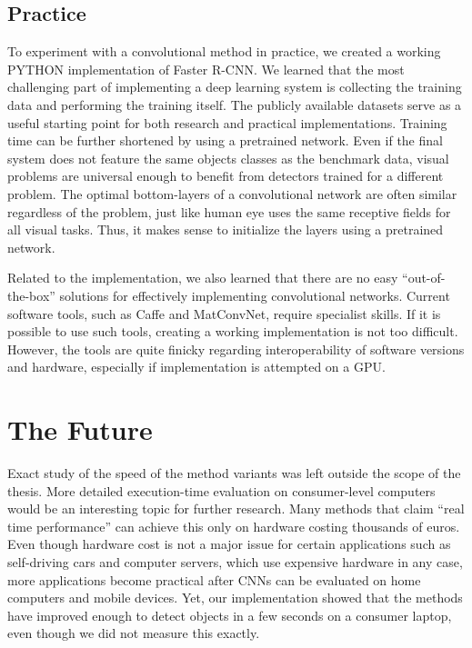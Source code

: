 \subsection{Practice}
To experiment with a convolutional method in practice, we created a working PYTHON implementation of Faster R-CNN. We learned that the most challenging part of implementing a deep learning system is collecting the training data and performing the training itself. The publicly available datasets serve as a useful starting point for both research and practical implementations. Training time can be further shortened by using a pretrained network. Even if the final system does not feature the same objects classes as the benchmark data, visual problems are universal enough to benefit from detectors trained for a different problem. The optimal bottom-layers of a convolutional network are often similar regardless of the problem, just like human eye uses the same receptive fields for all visual tasks. Thus, it makes sense to initialize the layers using a pretrained network.

Related to the implementation, we also learned that there are no easy “out-of-the-box” solutions for effectively implementing convolutional networks. Current software tools, such as Caffe and MatConvNet, require specialist skills. If it is possible to use such tools, creating a working implementation is not too difficult. However, the tools are quite finicky regarding interoperability of software versions and hardware, especially if implementation is attempted on a GPU.


\section{The Future}

Exact study of the speed of the method variants was left outside the scope of the thesis. More detailed execution-time evaluation on consumer-level computers would be an interesting topic for further research. Many methods that claim “real time performance” can achieve this only on hardware costing thousands of euros. Even though hardware cost is not a major issue for certain applications such as self-driving cars and computer servers, which use expensive hardware in any case, more applications become practical after CNNs can be evaluated on home computers and mobile devices. Yet, our implementation showed that the methods have improved enough to detect objects in a few seconds on a consumer laptop, even though we did not measure this exactly.

